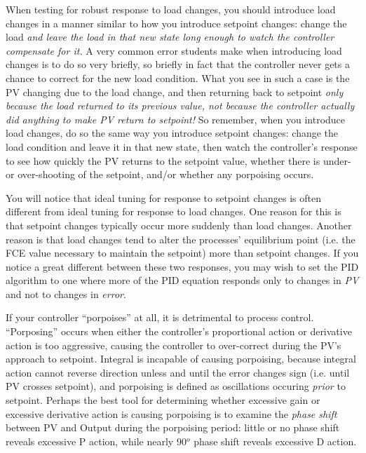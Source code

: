 \vskip 10pt

When testing for robust response to load changes, you should introduce load changes in a manner similar to how you introduce setpoint changes: change the load {\it and leave the load in that new state long enough to watch the controller compensate for it.}  A very common error students make when introducing load changes is to do so very briefly, so briefly in fact that the controller never gets a chance to correct for the new load condition.  What you see in such a case is the PV changing due to the load change, and then returning back to setpoint {\it only because the load returned to its previous value, not because the controller actually did anything to make PV return to setpoint!}  So remember, when you introduce load changes, do so the same way you introduce setpoint changes: change the load condition and leave it in that new state, then watch the controller's response to see how quickly the PV returns to the setpoint value, whether there is under- or over-shooting of the setpoint, and/or whether any porpoising occurs.

\vskip 10pt

You will notice that ideal tuning for response to setpoint changes is often different from ideal tuning for response to load changes.  One reason for this is that setpoint changes typically occur more suddenly than load changes.  Another reason is that load changes tend to alter the processes' equilibrium point (i.e. the FCE value necessary to maintain the setpoint) more than setpoint changes.  If you notice a great different between these two responses, you may wish to set the PID algorithm to one where more of the PID equation responds only to changes in {\it PV} and not to changes in {\it error}.

\vskip 10pt

If your controller ``porpoises'' at all, it is detrimental to process control.  ``Porposing'' occurs when either the controller's proportional action or derivative action is too aggressive, causing the controller to over-correct during the PV's approach to setpoint.  Integral is incapable of causing porpoising, because integral action cannot reverse direction unless and until the error changes sign (i.e. until PV crosses setpoint), and porpoising is defined as oscillations occuring {\it prior} to setpoint.  Perhaps the best tool for determining whether excessive gain or excessive derivative action is causing porpoising is to examine the {\it phase shift} between PV and Output during the porpoising period: little or no phase shift reveals excessive P action, while nearly 90$^{o}$ phase shift reveals excessive D action.


